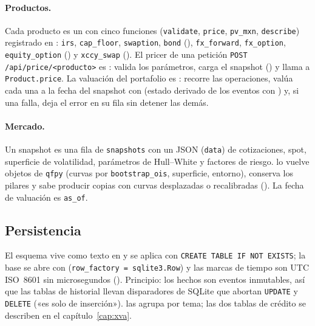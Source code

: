 \begin{sloppypar}
\paragraph{Productos.} Cada producto es un  con cinco funciones
(\texttt{validate}, \texttt{price}, \texttt{pv\_mxn}, \texttt{describe}) registrado en
: \texttt{irs}, \texttt{cap\_floor}, \texttt{swaption},
\texttt{bond} (), \texttt{fx\_forward}, \texttt{fx\_option},
\texttt{equity\_option} () y \texttt{xccy\_swap}
(). El pricer de una petición \texttt{POST /api/price/<producto>} es
: valida los parámetros, carga el snapshot
() y llama a \texttt{Product.price}. La valuación del portafolio es
: recorre las operaciones, valúa cada una a la fecha del snapshot con
 (estado derivado de los eventos con
) y, si una falla, deja el error en su fila sin detener las demás.

\paragraph{Mercado.} Un snapshot es una fila de \texttt{snapshots} con un JSON (\texttt{data}) de
cotizaciones, spot, superficie de volatilidad, parámetros de Hull--White y factores de riesgo.
 lo vuelve objetos de \texttt{qfpy} (curvas por
\texttt{bootstrap\_ois}, superficie, entorno), conserva los pilares y sabe producir copias con curvas
desplazadas o recalibradas (). La fecha de valuación es
\texttt{as\_of}.

\subsection{Persistencia}\label{sec:cap01-persistencia}

El esquema vive como texto en  y se aplica con \texttt{CREATE TABLE IF NOT
EXISTS}; la base se abre con  (\texttt{row\_factory = sqlite3.Row}) y las marcas
de tiempo son UTC ISO~8601 sin microsegundos (). Principio: los hechos son
eventos inmutables, así que las tablas de historial llevan disparadores de SQLite que abortan \texttt{UPDATE} y
\texttt{DELETE} («es solo de inserción»).  las agrupa por tema; las dos tablas
de crédito se describen en el capítulo~\ref{cap:xva}.


\end{sloppypar}
